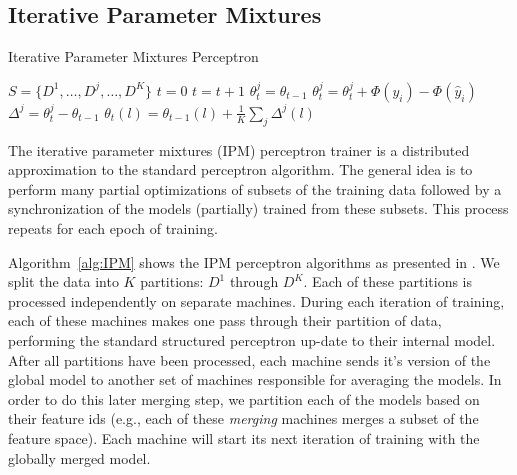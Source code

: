 \documentclass[a4paper]{article}
\begin{document}
\subsection{Iterative Parameter Mixtures}
\begin{algorithm}[h]
\caption{Iterative Parameter Mixtures Perceptron}
\label{alg:IPM}
\begin{algorithmic}
  \State {}
  \State $S=\{D^{1},\ldots,D^{j},\ldots,D^{K}\}$ 
  \State $t=0$
  \Repeat
    \State $t=t+1$
     
      \State $\theta_{t}^{j}=\theta_{t-1}$
          \State {}
          \State $\theta_{t}^{j}=\theta_{t}^{j}+\Phi(y_{i})-\Phi(\hat{y}_{i})$
        \EndIf
      \EndFor
      \State $\Delta^{j}=\theta_{t}^{j}-\theta_{t-1}$
    \EndFor
     
      \State $\theta_{t}(l)=\theta_{t-1}(l)+\frac{1}{K}\sum_{j}\Delta^{j}(l)$
    \EndFor
   \end{algorithmic} 
\end{algorithm}

The iterative parameter mixtures (IPM) perceptron trainer is a distributed
approximation to the standard perceptron algorithm. The general idea
is to perform many partial optimizations of subsets of the training
data followed by a synchronization of the models (partially) trained
from these subsets.  This process repeats for each epoch of training.

Algorithm~\ref{alg:IPM} shows the IPM perceptron algorithms as presented
in \cite{mcdonald10distributed}. We split the data into $K$
partitions: $D^{1}$ through $D^{K}$. Each of these
partitions is processed independently on separate machines. During each iteration
of training, each of these machines makes one pass through their partition
of data, performing the standard structured perceptron up-date to their internal
model.  After all partitions have been processed, each machine sends it's
version of the global model to another set of machines responsible for averaging
the models.  In order to do this later
merging step, we partition each of the models based on their feature ids (e.g.,
each of these \emph{merging} machines merges a subset of the feature space).
Each machine will start its next iteration of training with the globally merged
model.
\end{document}
